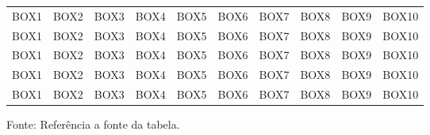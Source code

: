 \begin{landscape}
\begin{longtable}[c]{c|c|c|c|c|c|c|c|c|c}
	BOX1 & BOX2 & BOX3 & BOX4 & BOX5 & BOX6 &	BOX7 & BOX8 & BOX9 & BOX10 \\
	BOX1 & BOX2 & BOX3 & BOX4 & BOX5 & BOX6 &	BOX7 & BOX8 & BOX9 & BOX10 \\
	BOX1 & BOX2 & BOX3 & BOX4 & BOX5 & BOX6 &	BOX7 & BOX8 & BOX9 & BOX10 \\
	BOX1 & BOX2 & BOX3 & BOX4 & BOX5 & BOX6 &	BOX7 & BOX8 & BOX9 & BOX10 \\
	BOX1 & BOX2 & BOX3 & BOX4 & BOX5 & BOX6 &	BOX7 & BOX8 & BOX9 & BOX10 \\
\hline
\end{longtable}
\vspace{-8mm}
\begin{center}
	Fonte: Referência a fonte da tabela. 	%
\end{center}
\end{landscape}